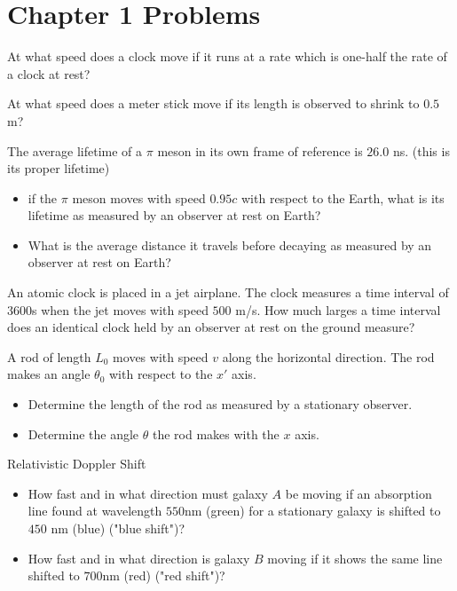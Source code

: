 \section{Chapter 1 Problems}
\begin{q}
	At what speed does a clock move if it runs at a rate which is one-half the rate of a clock at rest?
\end{q}
\begin{q}
	At what speed does a meter stick move if its length is observed to shrink to $ 0.5 $ m?
\end{q}
\begin{q}
	The average lifetime of a $ \pi $ meson in its own frame of reference is $ 26.0 $ ns. (this is its proper lifetime)
	\begin{itemize}
		\item if the $ \pi $ meson moves with speed $ 0.95 c $ with respect to the Earth, what is its lifetime as measured by an observer at rest on Earth?
		\item What is the average distance it travels before decaying as measured by an observer at rest on Earth?
	\end{itemize}
\end{q}
\begin{q}
	An atomic clock is placed in a jet airplane. The clock measures a time interval of $ 3600 $s when the jet moves with speed $ 500 $ m/s. How much larges a time interval does an identical clock held by an observer at rest on the ground measure?
\end{q}
\begin{q}
	A rod of length $ L_0 $ moves with speed $ v $ along the horizontal direction. The rod makes an angle $ \theta_0 $ with respect to the $ x' $ axis. 
	\begin{itemize}
		\item Determine the length of the rod as measured by a stationary observer.
		\item Determine the angle $ \theta $ the rod makes with the $ x $ axis.
	\end{itemize}
\end{q}
\begin{q}
	Relativistic Doppler Shift 
	\begin{itemize}
		\item How fast and in what direction must galaxy $ A $ be moving if an absorption line found at wavelength $ 550 $nm (green) for a stationary galaxy is shifted to $ 450 $ nm (blue) ("blue shift")?
		\item How fast and in what direction is galaxy $ B $ moving if it shows the same line shifted to $ 700 $nm (red) ("red shift")?
	\end{itemize}
\end{q}
